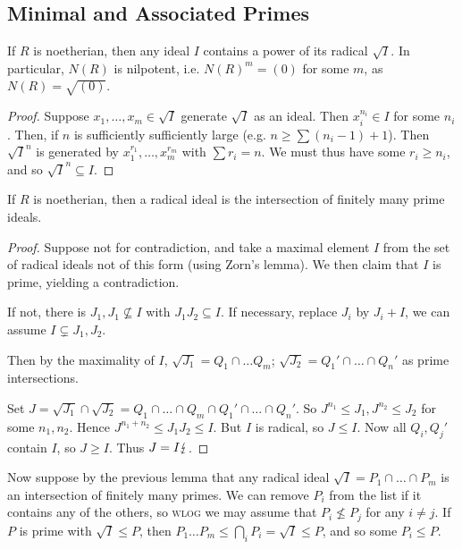 \documentclass[10pt,a4paper]{article}
\begin{document}
\subsection{Minimal and Associated Primes}
\begin{lemma}
  If $R$ is noetherian, then any ideal $I$ contains a power of its radical $\sqrt{I}$. In particular, $N(R)$ is nilpotent, i.e. $N(R)^m = (0)$ for some $m$, as $N(R) = \sqrt{(0)}$.
\end{lemma}
\begin{proof}
  Suppose $x_1, \ldots, x_m \in \sqrt{I}$ generate $\sqrt{I}$ as an ideal. Then $x_i^{n_i} \in I$ for some $n_i$. Then, if $n$ is sufficiently sufficiently large (e.g. $n \geq \sum (n_i-1) + 1$). Then $\sqrt{I}^n$ is generated by $x_1^{r_1}, \ldots, x_m^{r_m}$ with $\sum r_i = n$. We must thus have some $r_i \geq n_i$, and so $\sqrt{I}^n \subseteq I$.
\end{proof}

\begin{lemma}
  If $R$ is noetherian, then a radical ideal is the intersection of finitely many prime ideals.
\end{lemma}
\begin{proof}
  Suppose not for contradiction, and take a maximal element $I$ from the set of radical ideals not of this form (using Zorn's lemma). We then claim that $I$ is prime, yielding a contradiction.

  If not, there is $J_1, J_1 \nsubseteq I$ with $J_1J_2 \subseteq I$. If necessary, replace $J_i$ by $J_i + I$, we can assume $I \subsetneq J_1, J_2$.

  Then by the maximality of $I$, $\sqrt{J_1} = Q_1 \cap \ldots Q_m$; $\sqrt{J_2} = Q_1'\cap\ldots\cap Q_n'$ as prime intersections.

  Set $J = \sqrt{J_1} \cap \sqrt{J_2} = Q_1 \cap\ldots\cap Q_m\cap Q_1'\cap\ldots\cap Q_n'$. So $J^{n_1} \leq J_1, J^{n_2} \leq J_2$ for some $n_1, n_2$. Hence $J^{n_1+n_2} \leq J_1J_2\leq I$. But $I$ is radical, so $J \leq I$. Now all $Q_i, Q_j'$ contain $I$, so $J \geq I$. Thus $J=I \lightning$.
\end{proof}

Now suppose by the previous lemma that any radical ideal $\sqrt{I} = P_1\cap\ldots\cap P_m$ is an intersection of finitely many primes. We can remove $P_i$ from the list if it contains any of the others, so \textsc{wlog} we may assume that $P_i \nleq P_j$ for any $i \neq j$. If $P$ is prime with $\sqrt{I} \leq P$, then $P_1 \ldots P_m \leq \bigcap_i P_i = \sqrt{I} \leq P$, and so some $P_i \leq P$.
\end{document}
